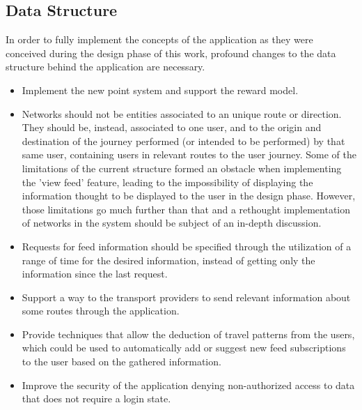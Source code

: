 \subsection{Data Structure}


In order to fully implement the concepts of the application as they were conceived during the design phase of this work, profound changes to the data structure behind the application are necessary. 

\begin{itemize}
\item Implement the new point system and support the reward model.
\item Networks should not be entities associated to an unique route or direction. They should be, instead, associated to one user, and to the origin and destination of the journey performed (or intended to be performed) by that same user, containing users in relevant routes to the user journey. 
Some of the limitations of the current structure formed an obstacle when implementing the 'view feed' feature, leading to the impossibility of displaying the information thought to be displayed to the user in the design phase. However, those limitations go much further than that and a rethought implementation of networks in the system should be subject of an in-depth discussion.

\item Requests for feed information should be specified through the utilization of a range of time for the desired information, instead of getting only the information since the last request.
\item Support a way to the transport providers to send relevant information about some routes through the application.
\item Provide techniques that allow the deduction of travel patterns from the users, which could be used to automatically add or suggest new feed subscriptions to the user based on the gathered information.
\item Improve the security of the application denying non-authorized access to data that does not require a login state. 
\end{itemize}

